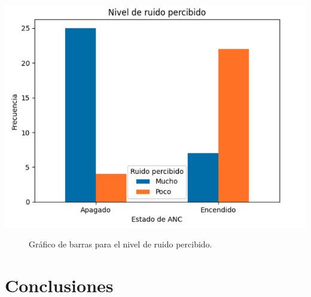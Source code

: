 \documentclass[a4paper,12pt]{article}
\begin{document}
\begin{center}
    \includegraphics[width=0.7\linewidth]{images/cross_Y1.png}
\end{center}
\vspace{\captionSpace}
\begin{figure}[H]
    \caption{Gráfico de barras para el nivel de ruido percibido.}
    \label{fig:cross_Y1}
\end{figure}



\section{Conclusiones}
\end{document}
